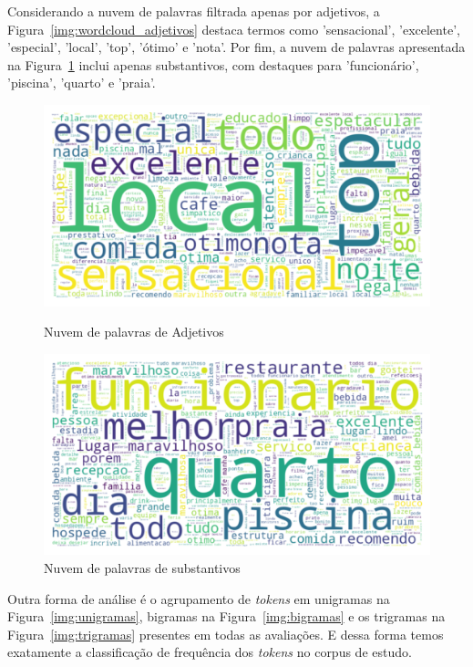 Considerando a nuvem de palavras filtrada apenas por adjetivos, a Figura~\ref{img:wordcloud_adjetivos} destaca termos como 'sensacional', 'excelente', 'especial', 'local', 'top', 'ótimo' e 'nota'. Por fim, a nuvem de palavras apresentada na Figura~\ref{img:wordcloud_substantivos} inclui apenas substantivos, com destaques para 'funcionário', 'piscina', 'quarto' e 'praia'.

\begin{figure}
	\centering
	\begin{minipage}{0.45\textwidth}
		\centering
		\includegraphics[width=1\textwidth]{figs/exploratoria/wordcloud_adjetivos.png}
		\caption{Nuvem de palavras de Adjetivos}
		\label{img:wordcloud_adjetivos}
	\end{minipage}
	\begin{minipage}{0.45\textwidth}
		\centering
		\includegraphics[width=1\textwidth]{figs/exploratoria/wordcloud_substantivos.png}
		\caption{Nuvem de palavras de substantivos}
		\label{img:wordcloud_substantivos}
	\end{minipage}
\end{figure}

Outra forma de análise é o agrupamento de \textit{tokens} em unigramas na Figura~\ref{img:unigramas}, bigramas na Figura~\ref{img:bigramas} e os trigramas na Figura~\ref{img:trigramas} presentes em todas as avaliações. E dessa forma temos exatamente a classificação de frequência dos \textit{tokens} no corpus de estudo.

